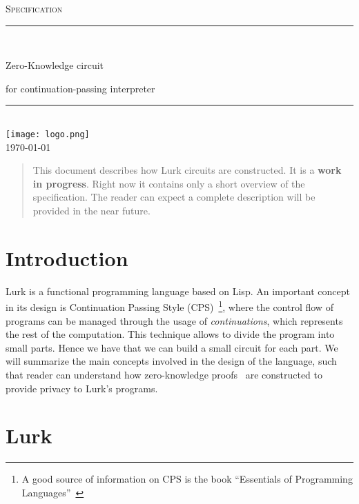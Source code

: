 \documentclass[10pt, english]{article}
\begin{document}
\begin{titlepage}
	\newcommand{\HRule}{\rule{\linewidth}{0.5mm}}

	\clearpage\thispagestyle{empty}
	\centering
	\vspace{1cm}

	\textsc{\Large Specification}\\[.5cm]
	\HRule\\[.5cm]
	{\Huge Zero-Knowledge circuit \par}
	\vspace{.5cm}
	{\Large for continuation-passing interpreter \par}
	\vspace{.5cm}
	\HRule \\[.5cm]


\texttt{[image: logo.png]}\\[.1cm]
	{\large \today}\\[2cm]
\vfill
\end{titlepage}


\begin{abstract}
  This document describes how Lurk circuits are constructed. It is a \textbf{work in progress}.
  Right now it contains only a short overview of the specification. The reader can expect a complete description will be provided in the near future.
\end{abstract}

\tableofcontents

\newpage

\section{Introduction}

Lurk is a functional programming language based on Lisp. An important concept in its design is Continuation Passing Style (CPS)~\footnote{A good source of information on CPS is the book ``Essentials of Programming Languages''~\cite{FWbook}}, where the control flow of programs can be managed through the usage of \textit{continuations}, which represents the rest of the computation. This technique allows to divide the program into small parts. Hence we have that we can build a small circuit for each part. We will summarize the main concepts involved in the design of the language, such that reader can understand how zero-knowledge proofs~\cite{groth16, nova, halo2} are constructed to provide privacy to Lurk's programs.

\section{Lurk}
\end{document}
